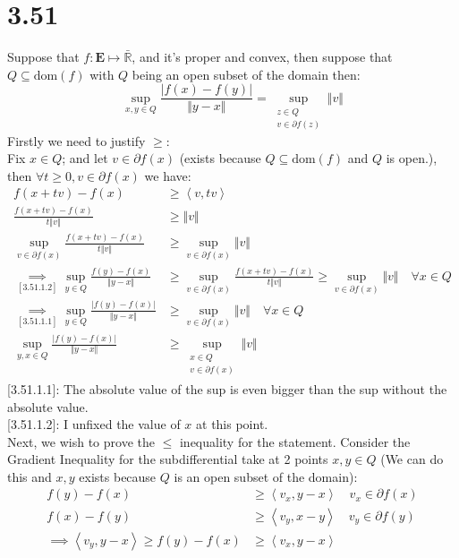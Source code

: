 \documentclass[]{article}
\begin{document}
\section*{3.51}
    Suppose that $f: \mathbf{E}\mapsto \bar{\mathbb{R}}$, and it's proper and convex, then suppose that $Q \subseteq \text{dom}(f)$ with $Q$ being an open subset of the domain then: 
    $$
        \sup_{x, y\in Q} \frac{|f(x) - f(y)|}{\Vert y - x\Vert}  = \sup_{\substack{z \in Q \\ v \in \partial f(z)}} \Vert v\Vert
    $$
    Firstly we need to justify $\ge$: 
    \\
    Fix $x\in Q$; and let $v\in \partial f(x)$ (exists because $Q \subseteq \text{dom}(f)$ and $Q$ is open.), then $\forall t \ge 0, v \in \partial f(x)$ we have: 
    \begin{align*}\tag{3.51.1}\label{eqn:3.51.1}
        f(x + tv) - f(x) &\ge \left\langle v, tv \right\rangle
        \\
        \frac{f(x + tv) - f(x)}{t \Vert v\Vert} &\ge \Vert v\Vert
        \\
        \sup_{v\in \partial f(x)} \frac{f(x + tv) - f(x)}{t \Vert v\Vert}
        & \ge 
        \sup_{v\in \partial f(x)} \Vert v\Vert 
        \\
        \underset{[3.51.1.2]}{\implies}
        \sup_{y\in Q} \frac{f(y) - f(x)}{\Vert y - x\Vert} &\ge 
        \sup_{v\in \partial f(x)} \frac{f(x + tv) - f(x)}{t \Vert v\Vert}
        \ge
        \sup_{v\in \partial f(x)} \Vert v\Vert \quad \forall x \in Q
        \\
        \underset{[3.51.1.1]}{\implies }
        \sup_{y\in Q} \frac{|f(y) - f(x)|}{\Vert y - x\Vert} 
        &\ge 
        \sup_{v\in \partial f(x)} \Vert v \Vert \quad \forall x \in Q
        \\
        \sup_{y, x\in Q}  \frac{|f(y) - f(x)|}{\Vert y - x\Vert} 
        & \ge \sup_{\substack{x \in Q \\ v \in \partial f(x)}} \Vert v\Vert
    \end{align*}
    [3.51.1.1]: The absolute value of the sup is even bigger than the sup without the absolute value. 
    \\[0.5em]
    [3.51.1.2]: I unfixed the value of $x$ at this point. 
    \\[1.1em]
    Next, we wish to prove the $\le$ inequality for the statement. Consider the Gradient Inequality for the subdifferential take at 2 points $x, y \in Q$ (We can do this and $x, y$ exists because $Q$ is an open subset of the domain): 
    \begin{align*}\tag{3.51.2}\label{eqn:3.51.2}
        f(y) - f(x) &\ge \left\langle v_x, y - x \right\rangle \quad v_x \in \partial f(x)
        \\
        f(x) - f(y) &\ge \left\langle v_y, x - y \right\rangle \quad v_y \in \partial f(y)
        \\
        \implies 
        \left\langle v_y, y - x \right\rangle \ge f(y) - f(x) &\ge \left\langle v_x, y - x \right\rangle
    \end{align*}
\end{document}
